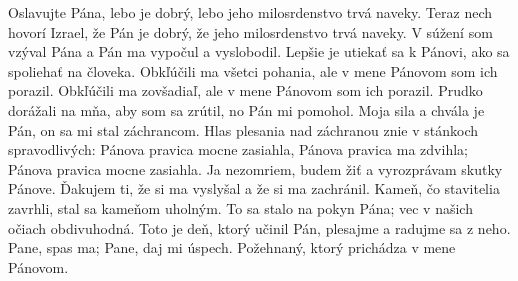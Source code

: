 Oslavujte Pána, lebo je dobrý,
lebo jeho milosrdenstvo trvá naveky.
\versseparator
Teraz nech hovorí Izrael, že Pán je dobrý,
že jeho milosrdenstvo trvá naveky.
\versseparator
V súžení som vzýval Pána
a Pán ma vypočul a vyslobodil.
\versseparator
Lepšie je utiekať sa k Pánovi,
ako sa spoliehať na človeka.
\versseparator
Obkľúčili ma všetci pohania,
ale v mene Pánovom som ich porazil.
\versseparator
Obkľúčili ma zovšadiaľ,
ale v mene Pánovom som ich porazil.
\versseparator
Prudko dorážali na mňa, aby som sa zrútil,
no Pán mi pomohol.
\versseparator
Moja sila a chvála je Pán,
on sa mi stal záchrancom.
\versseparator
Hlas plesania nad záchranou
znie v stánkoch spravodlivých:
\versseparator
Pánova pravica mocne zasiahla,
Pánova pravica ma zdvihla;
Pánova pravica mocne zasiahla.
\versseparator
Ja nezomriem, budem žiť
a vyrozprávam skutky Pánove.
\versseparator
Ďakujem ti, že si ma vyslyšal
a že si ma zachránil.
\versseparator
Kameň, čo stavitelia zavrhli,
stal sa kameňom uholným.
\versseparator
To sa stalo na pokyn Pána;
vec v našich očiach obdivuhodná.
\versseparator
Toto je deň, ktorý učinil Pán,
plesajme a radujme sa z neho.
\versseparator
Pane, spas ma;
Pane, daj mi úspech.
Požehnaný, ktorý prichádza v mene Pánovom.
